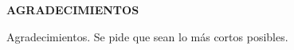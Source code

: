 \thispagestyle{empty}
\begin{center}
\textbf{AGRADECIMIENTOS}
\par\end{center}

Agradecimientos. Se pide que sean lo más cortos posibles.